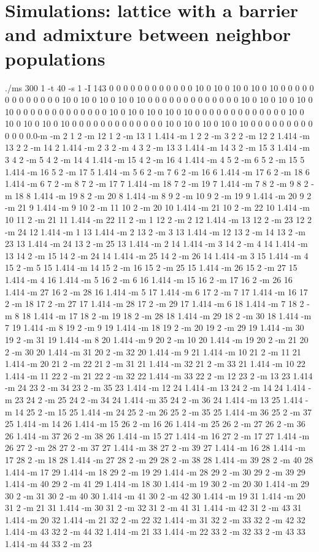 \documentclass[12pt]{article}
\begin{document}
\section*{Simulations: lattice with a barrier and admixture between neighbor populations}
./ms 300 1 -t 40 -s 1 -I 143 0 0 0 0 0 0 0 0 0 0 0 0 10 0 10 0 10 0 10 0 10 0 0 0 0 0 0 0 0 0 0 0 0 0 10 0 10 0 10 0 10 0 10 0 0 0 0 0 0 0 0 0 0 0 0 0 10 0 10 0 10 0 10 0 10 0 0 0 0 0 0 0 0 0 0 0 0 0 10 0 10 0 10 0 10 0 10 0 0 0 0 0 0 0 0 0 0 0 0 0 10 0 10 0 10 0 10 0 10 0 0 0 0 0 0 0 0 0 0 0 0 0 10 0 10 0 10 0 10 0 10 0 0 0 0 0 0 0 0 0 0 0 0 0.0-m -m 2 1 2 -m 12 1 2 -m 13 1 1.414 -m 1 2 2 -m 3 2 2 -m 12 2 1.414 -m 13 2 2 -m 14 2 1.414 -m 2 3 2 -m 4 3 2 -m 13 3 1.414 -m 14 3 2 -m 15 3 1.414 -m 3 4 2 -m 5 4 2 -m 14 4 1.414 -m 15 4 2 -m 16 4 1.414 -m 4 5 2 -m 6 5 2 -m 15 5 1.414 -m 16 5 2 -m 17 5 1.414 -m 5 6 2 -m 7 6 2 -m 16 6 1.414 -m 17 6 2 -m 18 6 1.414 -m 6 7 2 -m 8 7 2 -m 17 7 1.414 -m 18 7 2 -m 19 7 1.414 -m 7 8 2 -m 9 8 2 -m 18 8 1.414 -m 19 8 2 -m 20 8 1.414 -m 8 9 2 -m 10 9 2 -m 19 9 1.414 -m 20 9 2 -m 21 9 1.414 -m 9 10 2 -m 11 10 2 -m 20 10 1.414 -m 21 10 2 -m 22 10 1.414 -m 10 11 2 -m 21 11 1.414 -m 22 11 2 -m 1 12 2 -m 2 12 1.414 -m 13 12 2 -m 23 12 2 -m 24 12 1.414 -m 1 13 1.414 -m 2 13 2 -m 3 13 1.414 -m 12 13 2 -m 14 13 2 -m 23 13 1.414 -m 24 13 2 -m 25 13 1.414 -m 2 14 1.414 -m 3 14 2 -m 4 14 1.414 -m 13 14 2 -m 15 14 2 -m 24 14 1.414 -m 25 14 2 -m 26 14 1.414 -m 3 15 1.414 -m 4 15 2 -m 5 15 1.414 -m 14 15 2 -m 16 15 2 -m 25 15 1.414 -m 26 15 2 -m 27 15 1.414 -m 4 16 1.414 -m 5 16 2 -m 6 16 1.414 -m 15 16 2 -m 17 16 2 -m 26 16 1.414 -m 27 16 2 -m 28 16 1.414 -m 5 17 1.414 -m 6 17 2 -m 7 17 1.414 -m 16 17 2 -m 18 17 2 -m 27 17 1.414 -m 28 17 2 -m 29 17 1.414 -m 6 18 1.414 -m 7 18 2 -m 8 18 1.414 -m 17 18 2 -m 19 18 2 -m 28 18 1.414 -m 29 18 2 -m 30 18 1.414 -m 7 19 1.414 -m 8 19 2 -m 9 19 1.414 -m 18 19 2 -m 20 19 2 -m 29 19 1.414 -m 30 19 2 -m 31 19 1.414 -m 8 20 1.414 -m 9 20 2 -m 10 20 1.414 -m 19 20 2 -m 21 20 2 -m 30 20 1.414 -m 31 20 2 -m 32 20 1.414 -m 9 21 1.414 -m 10 21 2 -m 11 21 1.414 -m 20 21 2 -m 22 21 2 -m 31 21 1.414 -m 32 21 2 -m 33 21 1.414 -m 10 22 1.414 -m 11 22 2 -m 21 22 2 -m 32 22 1.414 -m 33 22 2 -m 12 23 2 -m 13 23 1.414 -m 24 23 2 -m 34 23 2 -m 35 23 1.414 -m 12 24 1.414 -m 13 24 2 -m 14 24 1.414 -m 23 24 2 -m 25 24 2 -m 34 24 1.414 -m 35 24 2 -m 36 24 1.414 -m 13 25 1.414 -m 14 25 2 -m 15 25 1.414 -m 24 25 2 -m 26 25 2 -m 35 25 1.414 -m 36 25 2 -m 37 25 1.414 -m 14 26 1.414 -m 15 26 2 -m 16 26 1.414 -m 25 26 2 -m 27 26 2 -m 36 26 1.414 -m 37 26 2 -m 38 26 1.414 -m 15 27 1.414 -m 16 27 2 -m 17 27 1.414 -m 26 27 2 -m 28 27 2 -m 37 27 1.414 -m 38 27 2 -m 39 27 1.414 -m 16 28 1.414 -m 17 28 2 -m 18 28 1.414 -m 27 28 2 -m 29 28 2 -m 38 28 1.414 -m 39 28 2 -m 40 28 1.414 -m 17 29 1.414 -m 18 29 2 -m 19 29 1.414 -m 28 29 2 -m 30 29 2 -m 39 29 1.414 -m 40 29 2 -m 41 29 1.414 -m 18 30 1.414 -m 19 30 2 -m 20 30 1.414 -m 29 30 2 -m 31 30 2 -m 40 30 1.414 -m 41 30 2 -m 42 30 1.414 -m 19 31 1.414 -m 20 31 2 -m 21 31 1.414 -m 30 31 2 -m 32 31 2 -m 41 31 1.414 -m 42 31 2 -m 43 31 1.414 -m 20 32 1.414 -m 21 32 2 -m 22 32 1.414 -m 31 32 2 -m 33 32 2 -m 42 32 1.414 -m 43 32 2 -m 44 32 1.414 -m 21 33 1.414 -m 22 33 2 -m 32 33 2 -m 43 33 1.414 -m 44 33 2 -m 23 
\end{document}
